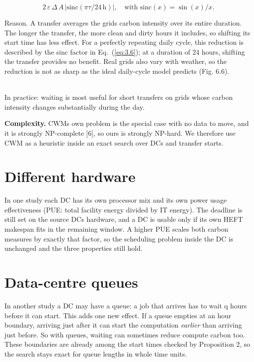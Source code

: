 \documentclass[12pt,a4paper,oneside,openany]{report}
\begin{document}
\begin{equation}
2\,\varepsilon\,\Delta\,A\,\bigl|\mathrm{sinc}(\pi\tau / 24\,\mathrm{h})\bigr|, \quad \text{with } \mathrm{sinc}(x) = \sin(x)/x.\label{eq:3.6}
\end{equation}

Reason. A transfer averages the grid\textquotesingle s carbon intensity
over its entire duration. The longer the transfer, the more clean and
dirty hours it includes, so shifting its start time has less effect. For
a perfectly repeating daily cycle, this reduction is described by the
sinc factor in Eq.~(\ref{eq:3.6}); at a duration of 24 hours, shifting the
transfer provides no benefit. Real grids also vary with weather, so the
reduction is not as sharp as the ideal daily-cycle model predicts (Fig.
6.6).\\
\strut \\
In practice: waiting is most useful for short transfers on grids whose
carbon intensity changes substantially during the day.

\textbf{Complexity.} CWM\textquotesingle s own problem is the special
case with no data to move, and it is strongly NP-complete {[}6{]}, so
ours is strongly NP-hard. We therefore use CWM as a heuristic inside an
exact search over DCs and transfer starts.

\section{Different hardware}\label{sec:3.4}

In one study each DC has its own processor mix and its own power usage
effectiveness (PUE: total facility energy divided by IT energy). The
deadline is still set on the source DC\textquotesingle s hardware, and a
DC is usable only if its own HEFT makespan fits in the remaining window.
A higher PUE scales both carbon measures by exactly that factor, so the
scheduling problem inside the DC is unchanged and the three properties
still hold.

\section{Data-centre queues}\label{sec:3.5}

In another study a DC may have a queue: a job that arrives has to wait q
hours before it can start. This adds one new effect. If a queue empties
at an hour boundary, arriving just after it can start the computation
\emph{earlier} than arriving just before. So with queues, waiting can
sometimes reduce compute carbon too. These boundaries are already among
the start times checked by Proposition 2, so the search stays exact for
queue lengths in whole time units.
\end{document}

